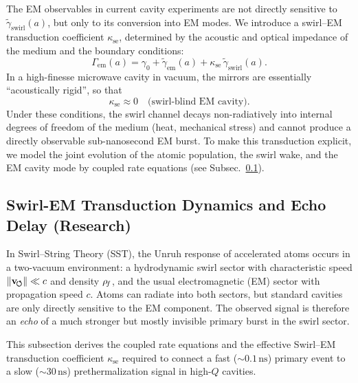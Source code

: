 The EM observables in current cavity experiments \cite{Deswal2025,Zheng2025,Saha2025}
are not directly sensitive to $\tilde\gamma_{\text{swirl}}(a)$, but only to
its conversion into EM modes. We introduce a swirl--EM transduction
coefficient $\kappa_{\text{se}}$, determined by the acoustic and optical
impedance of the medium and the boundary conditions:
\begin{equation}
    \Gamma_{\text{em}}(a)
    = \gamma_0
    + \tilde\gamma_{\text{em}}(a)
    + \kappa_{\text{se}}\,\tilde\gamma_{\text{swirl}}(a).
    \label{eq:gamma_em_effective}
\end{equation}
In a high-finesse microwave cavity in vacuum, the mirrors are essentially
``acoustically rigid'', so that
\begin{equation}
    \kappa_{\text{se}} \approx 0
    \quad\text{(swirl-blind EM cavity)}.
\end{equation}
Under these conditions, the swirl channel decays non-radiatively into
internal degrees of freedom of the medium (heat, mechanical stress) and
cannot produce a directly observable sub-nanosecond EM burst.
To make this transduction explicit, we model the joint evolution of the atomic population, the swirl wake, and the EM cavity mode by coupled rate equations (see Subsec.~\ref{subsec:swirl_em_transduction_dynamics}).


\subsection{Swirl-EM Transduction Dynamics and Echo Delay (Research)}
    \label{subsec:swirl_em_transduction_dynamics}

    In Swirl--String Theory (SST), the Unruh response of accelerated atoms occurs in a
    two-vacuum environment: a hydrodynamic swirl sector with characteristic speed
    $\lVert\mathbf{v}_{\!\boldsymbol{\circlearrowleft}}\rVert \ll c$ and density $\rho_{\!f}$, and the usual electromagnetic
    (EM) sector with propagation speed $c$.\cite{Unruh1976,Crispino2008,Barcelo2011}
    Atoms can radiate into both sectors, but standard cavities are only directly
    sensitive to the EM component. The observed signal is therefore an
    \emph{echo} of a much stronger but mostly invisible primary burst in the swirl
    sector.

    This subsection derives the coupled rate equations and the effective
    Swirl--EM transduction coefficient $\kappa_{\text{se}}$ required to connect a fast
    ($\sim 0.1\,\mathrm{ns}$) primary event to a slow ($\sim 30\,\mathrm{ns}$)
    prethermalization signal in high-$Q$ cavities.

